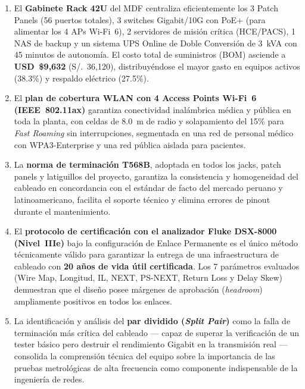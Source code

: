 \begin{enumerate}[leftmargin=*, label=\arabic*.]
    \item El \textbf{Gabinete Rack 42U} del MDF centraliza eficientemente los 3 Patch Panels (56 puertos totales), 3 switches Gigabit/10G con PoE+ (para alimentar los 4 APs Wi-Fi~6), 2 servidores de misión crítica (HCE/PACS), 1 NAS de backup y un sistema UPS Online de Doble Conversión de 3~kVA con 45 minutos de autonomía. El costo total de suministros (BOM) asciende a \textbf{USD~\$9,632} (S/.~36,120), distribuyéndose el mayor gasto en equipos activos (38.3\%) y respaldo eléctrico (27.5\%).
    
    \item El \textbf{plan de cobertura WLAN con 4 Access Points Wi-Fi~6 (IEEE~802.11ax)} garantiza conectividad inalámbrica médica y pública en toda la planta, con celdas de 8.0~m de radio y solapamiento del 15\% para \textit{Fast Roaming} sin interrupciones, segmentada en una red de personal médico con WPA3-Enterprise y una red pública aislada para pacientes.
    
    \item La \textbf{norma de terminación T568B}, adoptada en todos los jacks, patch panels y latiguillos del proyecto, garantiza la consistencia y homogeneidad del cableado en concordancia con el estándar de facto del mercado peruano y latinoamericano, facilita el soporte técnico y elimina errores de pinout durante el mantenimiento.
    
    \item El \textbf{protocolo de certificación con el analizador Fluke DSX-8000 (Nivel~IIIe)} bajo la configuración de Enlace Permanente es el único método técnicamente válido para garantizar la entrega de una infraestructura de cableado con \textbf{20 años de vida útil certificada}. Los 7 parámetros evaluados (Wire Map, Longitud, IL, NEXT, PS-NEXT, Return Loss y Delay Skew) demuestran que el diseño posee márgenes de aprobación (\textit{headroom}) ampliamente positivos en todos los enlaces.
    
    \item La identificación y análisis del \textbf{par dividido (\textit{Split Pair})} como la falla de terminación más crítica del cableado --- capaz de superar la verificación de un tester básico pero destruir el rendimiento Gigabit en la transmisión real --- consolida la comprensión técnica del equipo sobre la importancia de las pruebas metrológicas de alta frecuencia como componente indispensable de la ingeniería de redes.

\end{enumerate}
